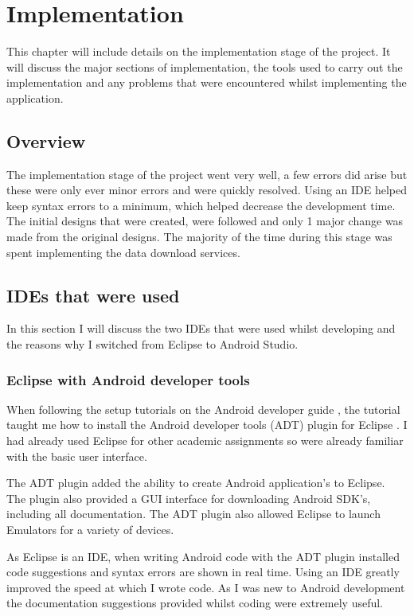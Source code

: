 \chapter{Implementation}

This chapter will include details on the implementation stage of the project. It will discuss the major sections of implementation, the tools used to carry out the implementation and any problems that were encountered whilst implementing the application.

\section{Overview}

The implementation stage of the project went very well, a few errors did arise but these were only ever minor errors and were quickly resolved. Using an IDE helped keep syntax errors to a minimum, which helped decrease the development time. The initial designs that were created, were followed and only 1 major change was made from the original designs. The majority of the time during this stage was spent implementing the data download services.

\section{IDEs that were used}

In this section I will discuss the two IDEs that were used whilst developing and the reasons why I switched from Eclipse to Android Studio.

\subsection{Eclipse with Android developer tools}

When following the setup tutorials on the Android developer guide \cite{android_sdk}, the tutorial taught me how to install the Android developer tools (ADT) plugin for Eclipse \cite{eclipse}. I had already used Eclipse for other academic assignments so were already familiar with the basic user interface. 

The ADT plugin added the ability to create Android application's to Eclipse. The plugin also provided a GUI interface for downloading Android SDK's, including all documentation. The ADT plugin also allowed Eclipse to launch Emulators for a variety of devices.

As Eclipse is an IDE, when writing Android code with the ADT plugin installed code suggestions and syntax errors are shown in real time. Using an IDE greatly improved the speed at which I wrote code. As I was new to Android development the documentation suggestions provided whilst coding were extremely useful.


